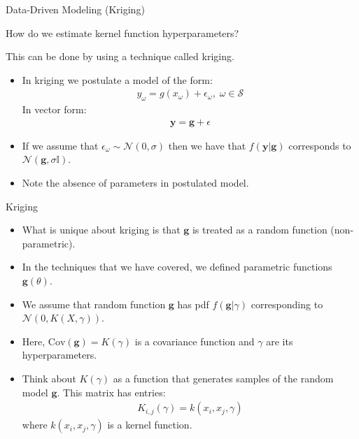\documentclass[9pt]{beamer}
\begin{document}
\begin{frame}{Data-Driven Modeling (Kriging)}

\begin{block}{}
How do we estimate kernel function hyperparameters?
\end{block}

This can be done by using a technique called kriging. 
\begin{itemize}
\item In kriging we postulate a model of the form:
\begin{align*}
{y}_\omega = g(x_\omega)+\epsilon_\omega,\; \omega \in \mathcal{S}
\end{align*}
In vector form:
\begin{align*}
\mathbf{y}= \mathbf{g}+\epsilon
\end{align*}
\item If we assume that $\epsilon_\omega \sim \mathcal{N}(0,\sigma)$ then we have that $f(\mathbf{y}|\mathbf{g})$ corresponds to $\mathcal{N}(\mathbf{g},\sigma \mathbb{I})$. 
\item Note the absence of parameters in postulated model. 
\end{itemize}


\end{frame}


\begin{frame}{Kriging}

\begin{itemize}

\item What is unique about kriging is that $\mathbf{g}$ is treated as a random function (non-parametric). 

\item In the techniques that we have covered, we defined parametric functions $\mathbf{g}(\theta)$.

\item We assume that random function $\mathbf{g}$ has pdf $f(\mathbf{g}|\gamma)$ corresponding to $\mathcal{N}(0,K(X,\gamma))$.  

\item Here, $\textrm{Cov}(\mathbf{g})=K(\gamma)$ is a covariance function and $\gamma$ are its hyperparameters.  

\item Think about $K(\gamma)$ as a function that generates samples of the random model $\mathbf{g}$. This matrix has entries:
\begin{align}
K_{i,j}(\gamma)=k(x_i,x_j,\gamma)
\end{align}
where $k(x_i,x_j,\gamma)$ is a kernel function. 

\end{itemize}


\end{frame}
\end{document}
